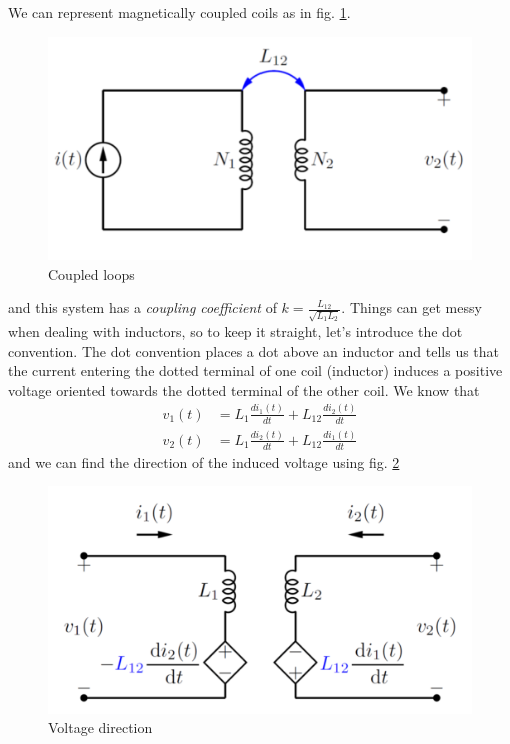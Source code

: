 \documentclass[nobib]{tufte-handout}
\begin{document}
We can represent magnetically coupled coils as 
in fig. \ref{fig:coupled}. 
\begin{figure}
    \center 
    \caption{Coupled loops}
    \label{fig:coupled}
    \includegraphics{images/coupledloops.png}
\end{figure}
and this system has a \emph{coupling coefficient} 
of $k = \frac{L_{12}}{\sqrt{L_1 L_2}}$.
Things can get messy when dealing with inductors, 
so to keep it straight, let's introduce the dot convention. 
The dot convention places a dot above an inductor and tells us 
that the current entering the dotted terminal of one
coil (inductor) induces a positive voltage oriented
towards the dotted terminal of the other coil.
We know that 
\begin{align*}
    v_{1}(t) &= L_1 \frac{di_1(t)}{dt} + L_{12}\frac{di_2(t)}{dt} \\
    v_{2}(t) &= L_1 \frac{di_2(t)}{dt} + L_{12}\frac{di_1(t)}{dt}
\end{align*}
and we can find the direction of the induced voltage using 
fig. \ref{fig:voltdir}
\begin{figure}
    \center 
    \caption{Voltage direction}
    \label{fig:voltdir}
    \includegraphics[width=\textwidth/2]{images/directionofinducedvoltage.png}
\end{figure}
\end{document}
